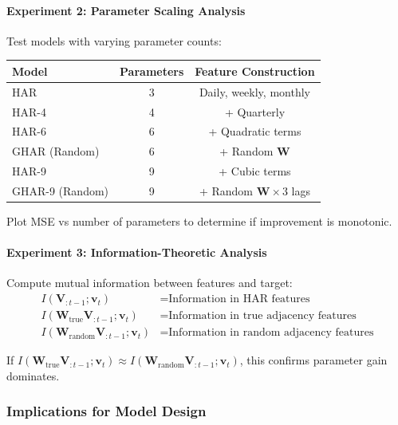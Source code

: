 \documentclass[10pt,a4paper]{article}
\begin{document}
\paragraph{Experiment 2: Parameter Scaling Analysis}

Test models with varying parameter counts:

\begin{table}[H]
\centering
\small
\begin{tabular}{lcc}
\toprule
Model & Parameters & Feature Construction \\
\midrule
HAR & 3 & Daily, weekly, monthly \\
HAR-4 & 4 & + Quarterly \\
HAR-6 & 6 & + Quadratic terms \\
GHAR (Random) & 6 & + Random $\mathbf{W}$ \\
HAR-9 & 9 & + Cubic terms \\
GHAR-9 (Random) & 9 & + Random $\mathbf{W} \times 3$ lags \\
\bottomrule
\end{tabular}
\end{table}

Plot MSE vs number of parameters to determine if improvement is monotonic.

\paragraph{Experiment 3: Information-Theoretic Analysis}

Compute mutual information between features and target:
\begin{align}
I(\mathbf{V}_{:t-1}; \mathbf{v}_t) &= \text{Information in HAR features}\\
I(\mathbf{W}_{\text{true}} \mathbf{V}_{:t-1}; \mathbf{v}_t) &= \text{Information in true adjacency features}\\
I(\mathbf{W}_{\text{random}} \mathbf{V}_{:t-1}; \mathbf{v}_t) &= \text{Information in random adjacency features}
\end{align}

If $I(\mathbf{W}_{\text{true}} \mathbf{V}_{:t-1}; \mathbf{v}_t) \approx I(\mathbf{W}_{\text{random}} \mathbf{V}_{:t-1}; \mathbf{v}_t)$, this confirms parameter gain dominates.

\subsubsection{Implications for Model Design}
\end{document}
